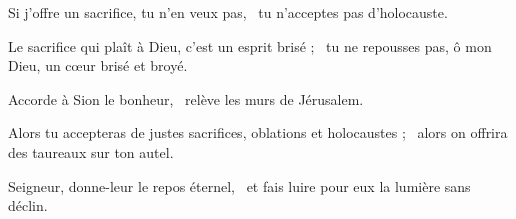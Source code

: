 \item Si j'offre un sacrifice, tu n'en veux pas,~\psstar{} tu n'acceptes pas d'holocauste.

\item Le sacrifice qui plaît à Dieu, c'est un esprit brisé ;~\psstar{} tu ne repousses pas, ô mon Dieu, un cœur brisé et broyé.

\item Accorde à Sion le bonheur,~\psstar{} relève les murs de Jérusalem.

\item Alors tu accepteras de justes sacrifices, oblations et holocaustes ;~\psstar{} alors on offrira des taureaux sur ton autel.

\item Seigneur, donne-leur le repos éternel,~\psstar{} et fais luire pour eux la lumière sans déclin.